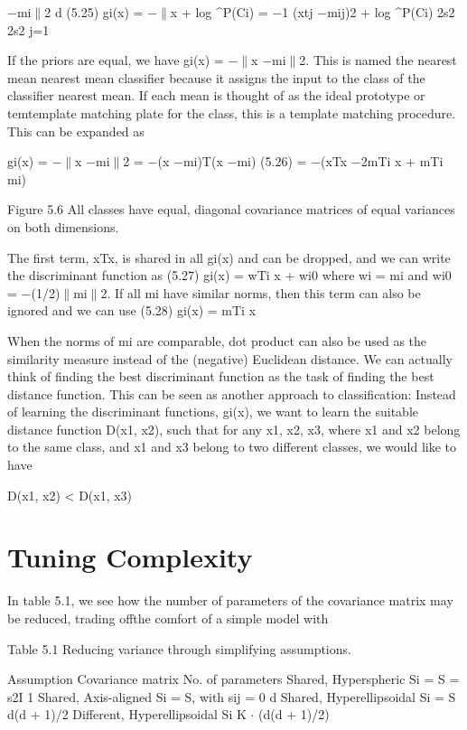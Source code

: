 $-$mi$\parallel$2 d (5.25) gi(x) = $-$$\parallel$x + log \textasciicircum{}P(Ci) = $-$1 (xtj $-$mij)2 + log \textasciicircum{}P(Ci) 2s2 2s2 j=1

If the priors are equal, we have gi(x) = $-$$\parallel$x $-$mi$\parallel$2. This is named the nearest mean nearest mean classifier because it assigns the input to the class of the classifier nearest mean. If each mean is thought of as the ideal prototype or temtemplate matching plate for the class, this is a template matching procedure. This can be expanded as

gi(x) = $-$$\parallel$x $-$mi$\parallel$2 = $-$(x $-$mi)T(x $-$mi) (5.26) = $-$(xTx $-$2mTi x + mTi mi)

Figure 5.6 All classes have equal, diagonal covariance matrices of equal variances on both dimensions.

The first term, xTx, is shared in all gi(x) and can be dropped, and we can write the discriminant function as (5.27) gi(x) = wTi x + wi0 where wi = mi and wi0 = $-$(1/2)$\parallel$mi$\parallel$2. If all mi have similar norms, then this term can also be ignored and we can use (5.28) gi(x) = mTi x

When the norms of mi are comparable, dot product can also be used as the similarity measure instead of the (negative) Euclidean distance. We can actually think of finding the best discriminant function as the task of finding the best distance function. This can be seen as another approach to classification: Instead of learning the discriminant functions, gi(x), we want to learn the suitable distance function D(x1, x2), such that for any x1, x2, x3, where x1 and x2 belong to the same class, and x1 and x3 belong to two different classes, we would like to have

D(x1, x2) < D(x1, x3)

\section{Tuning Complexity}

In table 5.1, we see how the number of parameters of the covariance matrix may be reduced, trading offthe comfort of a simple model with

Table 5.1 Reducing variance through simplifying assumptions.

Assumption Covariance matrix No. of parameters Shared, Hyperspheric Si = S = s2I 1 Shared, Axis-aligned Si = S, with sij = 0 d Shared, Hyperellipsoidal Si = S d(d + 1)/2 Different, Hyperellipsoidal Si K $\cdot$ (d(d + 1)/2)

